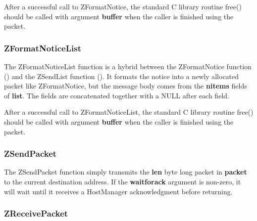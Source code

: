 After a successful call to ZFormatNotice, the standard C library routine
free() should be called with argument {\bf *buffer} when the caller is
finished using the packet.

\subsubsection{ZFormatNoticeList}
\label{ZFormatNoticeList}

\etemplate
{}

The ZFormatNoticeList function is a hybrid between the ZFormatNotice
function () and the ZSendList function
().  It formats the notice into a newly allocated packet like
ZFormatNotice, but the message body comes from the {\bf nitems} fields
of {\bf list}.  The fields are concatenated together with a NULL after
each field.

After a successful call to ZFormatNoticeList, the standard C library routine
free() should be called with argument {\bf *buffer} when the caller is
finished using the packet.

\subsubsection{ZSendPacket}
\label{ZSendPacket}

\etemplate
{}

The ZSendPacket function simply transmits the {\bf len} byte long
packet in {\bf packet} to the current destination address.  If the
{\bf waitforack} argument is non-zero, it 
will wait until it receives a HostManager acknowledgment before returning.

\subsubsection{ZReceivePacket}
\label{ZReceivePacket}

\etemplate
{}

